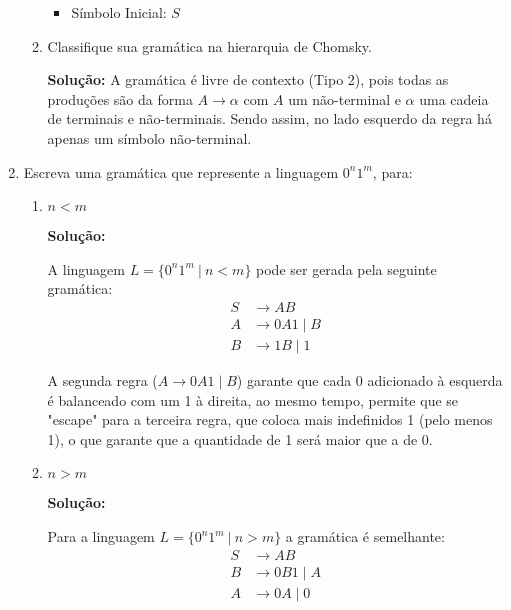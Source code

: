 \documentclass[12pt]{article}
\begin{document}
\begin{enumerate}
\begin{enumerate}[label=\alph*)]
\begin{itemize}
			            \item Símbolo Inicial: $S$
		            \end{itemize}
		            
		            
		      \item Classifique sua gramática na hierarquia de Chomsky.
		            
		            \textbf{Solução:} A gramática é livre de contexto (Tipo 2), pois todas as produções são da forma $A \rightarrow \alpha$ com $A$ um não-terminal e $\alpha$ uma cadeia de terminais e não-terminais. Sendo assim, no lado esquerdo da regra há apenas um símbolo não-terminal.
	      \end{enumerate}
	      
	\item Escreva uma gramática que represente a linguagem $0^n1^m$, para:
	      \begin{enumerate}[label=\alph*)]
		      \item $n < m$
		            
		            \textbf{Solução:}
		            
		            A linguagem $L = \{0^n 1^m \ | \ n < m \}$ pode ser gerada pela seguinte gramática:
		            \begin{align*}
			            S & \rightarrow AB         \\
			            A & \rightarrow 0A1 \mid B \\
			            B & \rightarrow 1B \mid 1
		            \end{align*}
		            
		            A segunda regra ($A \rightarrow 0A1 \mid B$) garante que cada 0 adicionado à esquerda é balanceado com um 1 à direita, ao mesmo tempo, permite que se "escape" para a terceira regra, que coloca mais indefinidos 1 (pelo menos 1), o que garante que a quantidade de 1 será maior que a de 0.
		            
		      \item $n > m$
		            
		            \textbf{Solução:}
		            
		            Para a linguagem $L = \{0^n 1^m \ | \ n > m \}$ a gramática é semelhante:
		            \begin{align*}
			            S & \rightarrow AB         \\
			            B & \rightarrow 0B1 \mid A \\
			            A & \rightarrow 0A \mid 0
		            \end{align*}
		            

\end{enumerate}
\end{enumerate}
\end{document}
